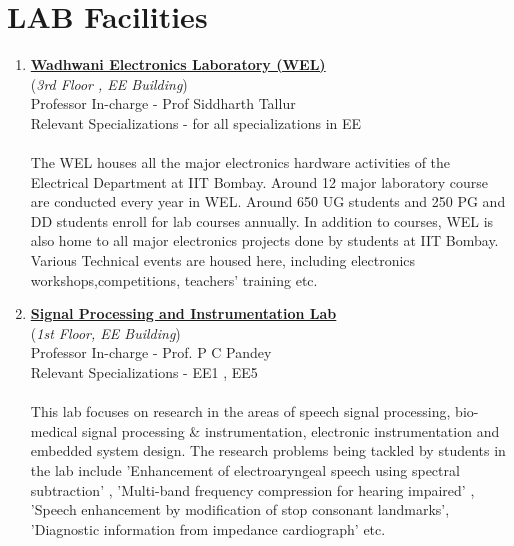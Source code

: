 \documentclass[openany]{book} %
\begin{document}
\chapter{LAB Facilities}
\begin{enumerate}
    \item \href{https://www.ee.iitb.ac.in/~wel_iitb/}{\color{blue}  \textbf{Wadhwani Electronics Laboratory (WEL)}}\\
    (\textit{3rd Floor , EE Building})\\
    Professor In-charge - Prof Siddharth Tallur\\
Relevant Specializations - for all specializations in EE\\
\\
The WEL houses all the major electronics hardware activities of the Electrical Department at IIT Bombay. Around 12 major laboratory course are conducted every year in WEL. Around 650 UG students and 250 PG and DD students enroll for lab courses annually. In addition to courses, WEL is also home to all major electronics projects done by students at IIT Bombay. Various Technical events are housed here, including electronics workshops,competitions, teachers' training etc.\\

\item \href{http://www.ee.iitb.ac.in/~spilab} {\color{blue}  \textbf{Signal Processing and Instrumentation Lab} }\\
    (\textit{1st Floor, EE Building})\\
    Professor In-charge - Prof. P C Pandey\\
Relevant Specializations - EE1 , EE5\\
\\
This lab focuses on research in the areas of speech signal processing, bio-medical signal processing \& instrumentation, electronic instrumentation and embedded system design. The research problems being tackled by students in the lab include 'Enhancement of electroaryngeal speech using spectral subtraction' , 'Multi-band frequency compression for hearing impaired' , 'Speech enhancement by modification of stop consonant landmarks', 'Diagnostic information from impedance cardiograph' etc.\\



\end{enumerate}
\end{document}

